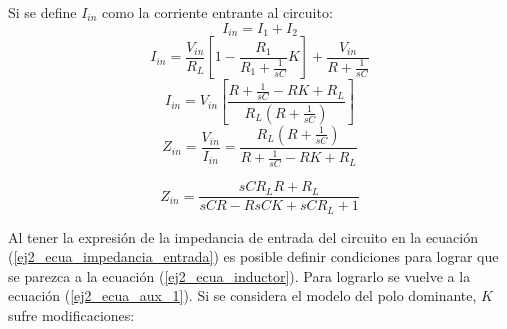 \documentclass[12pt,a4paper]{article}
\begin{document}
Si se define $I_{in}$ como la corriente entrante al circuito:
\begin{displaymath} I_{in} = I_1 + I_2 \end{displaymath}
\begin{displaymath} I_{in} = \frac{V_{in}}{R_L}[1-\frac{R_1}{R_1 + \frac{1}{sC}}K]  + \frac{V_{in}}{R + \frac{1}{sC}}  \end{displaymath}
\begin{displaymath} I_{in} = V_{in}[\frac{R + \frac{1}{sC} - RK + R_L}{R_L (R + \frac{1}{sC})}]  \end{displaymath}
\begin{displaymath} Z_{in} = \frac{V_{in}}{I_{in}} = \frac{R_L (R + \frac{1}{sC})}{R + \frac{1}{sC} - RK + R_L }  \end{displaymath}

\begin{equation} Z_{in} = \frac{sC R_L R + R_L}{sCR - RsCK +sCR_L + 1} \label{ej2_ecua_impedancia_entrada}\end{equation}

Al tener la expresión de la impedancia de entrada del circuito en la ecuación (\ref{ej2_ecua_impedancia_entrada}) es posible definir condiciones para lograr que se parezca a la ecuación (\ref{ej2_ecua_inductor}).
Para lograrlo se vuelve a la ecuación (\ref{ej2_ecua_aux_1}). Si se considera el modelo del polo dominante, $K$ sufre modificaciones:
\end{document}
